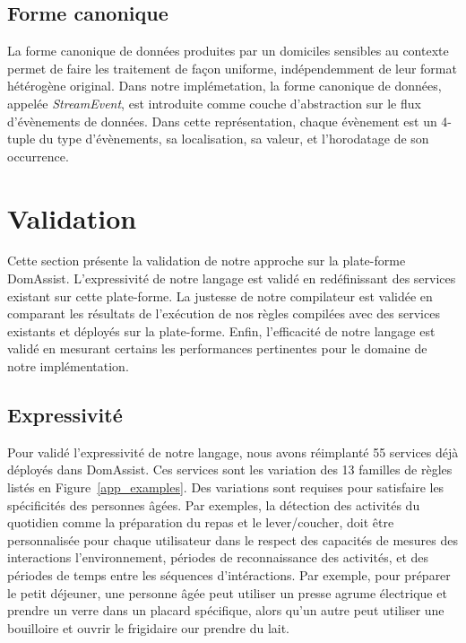 \subsection*{Forme canonique}
La forme canonique de données produites par un domiciles sensibles au contexte permet de faire les traitement de façon uniforme, indépendemment de leur format hétérogène original. Dans notre implémetation, la forme canonique de données, appelée {\em StreamEvent}, est introduite comme couche d'abstraction sur le flux d'évènements de données. Dans cette représentation, chaque évènement est un 4-tuple du type d'évènements, sa localisation, sa valeur, et l'horodatage de son occurrence.

\section{Validation}\label{sec:validation}

Cette section présente la validation de notre approche sur la plate-forme DomAssist. L'expressivité de notre langage est validé en redéfinissant des services existant sur cette plate-forme. La justesse de notre compilateur est validée en comparant les résultats de l'exécution de nos règles compilées avec des services existants et déployés sur la plate-forme. Enfin, l'efficacité de notre langage est validé en mesurant certains les performances pertinentes pour le domaine de notre implémentation.



\subsection{Expressivité}\label{validation:expressiveness}
Pour validé l'expressivité de notre langage, nous avons réimplanté 55 services déjà déployés dans DomAssist. Ces services sont les variation des 13 familles de règles listés en Figure~\ref{app_examples}. Des variations sont requises pour satisfaire les spécificités des personnes âgées. Par exemples, la détection des activités du quotidien comme la préparation du repas et le lever/coucher, doit être personnalisée pour chaque utilisateur dans le respect des capacités de mesures des interactions l'environnement, périodes de reconnaissance des activités, et des périodes de temps entre les séquences d'intéractions. Par exemple, pour préparer le petit déjeuner, une personne âgée peut utiliser un presse agrume électrique et prendre un verre dans un placard spécifique, alors qu'un autre peut utiliser une bouilloire et ouvrir le frigidaire our prendre du lait.


